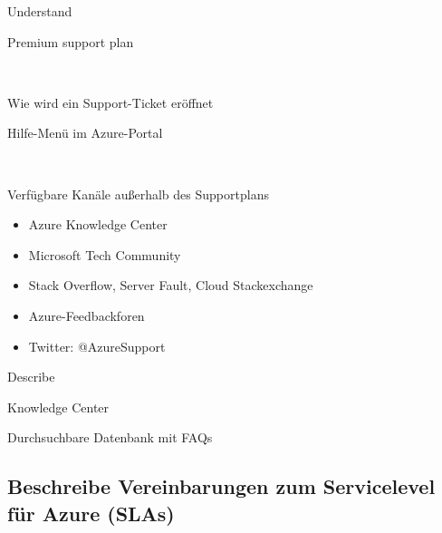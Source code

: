 \documentclass{scrartcl}
\newenvironment{flashcard}[2][]{%
    #1
    \vfill
    \centerline{\Large{#2}}
    \vfill
\newpage
}
{\newpage}
\newcommand{\subsectioncard}[1]{
    \vspace*{\stretch{1}}
    \subsection{#1}
    \vspace*{\stretch{1}}
    \pagebreak
}
\begin{document}
    \begin{flashcard}[Understand]{Premium support plan}

    \end{flashcard}

    \begin{flashcard}[\ ]{Wie wird ein Support-Ticket eröffnet}
        Hilfe-Menü im Azure-Portal
    \end{flashcard}

    \begin{flashcard}[\ ]{Verfügbare Kanäle außerhalb des Supportplans}
        \begin{itemize}
            \item Azure Knowledge Center
            \item Microsoft Tech Community
            \item Stack Overflow, Server Fault, Cloud Stackexchange
            \item Azure-Feedbackforen
            \item Twitter: @AzureSupport
        \end{itemize}

    \end{flashcard}

    \begin{flashcard}[Describe]{Knowledge Center}
        Durchsuchbare Datenbank mit FAQs
    \end{flashcard}

    \subsectioncard{Beschreibe Vereinbarungen zum Servicelevel für Azure (SLAs)}
\end{document}
